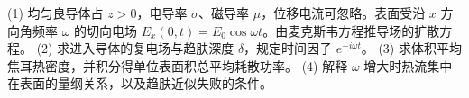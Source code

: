 (1) 均匀良导体占 \(z>0\)，电导率 \(\sigma\)、磁导率 \(\mu\)，位移电流可忽略。表面受沿 \(x\) 方向角频率 \(\omega\) 的切向电场 \(E_x(0,t)=E_0\cos\omega t\)。由麦克斯韦方程推导场的扩散方程。
(2) 求进入导体的复电场与趋肤深度 \(\delta\)，规定时间因子 \(e^{-i\omega t}\)。
(3) 求体积平均焦耳热密度，并积分得单位表面积总平均耗散功率。
(4) 解释 \(\omega\) 增大时热流集中在表面的量纲关系，以及趋肤近似失败的条件。
